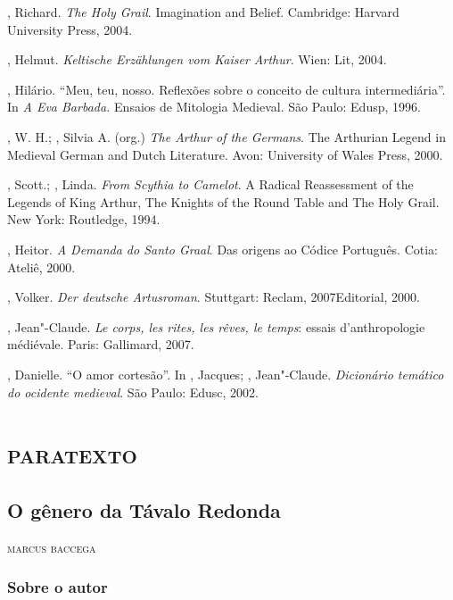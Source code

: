 \begin{bibliohedra}

, Richard. \textit{ The Holy Grail}. Imagination and Belief. Cambridge:
Harvard University Press, 2004.

, Helmut. \textit{Keltische Erzählungen vom Kaiser Arthur}. Wien: Lit,
2004.

, Hilário. “Meu, teu, nosso. Reflexões sobre o conceito de cultura
intermediária”. In \textit{A Eva Barbada. }Ensaios de Mitologia Medieval. São
Paulo: Edusp, 1996.

, W. H.; , Silvia A. (org.) \textit{The Arthur of the Germans}. The
Arthurian Legend in Medieval German and Dutch Literature. Avon: University of
Wales Press, 2000. 

, Scott.; , Linda. \textit{From Scythia to Camelot}. A Radical
Reassessment of the Legends of King Arthur, The Knights of the Round Table and
The Holy Grail. New York: Routledge, 1994.

, Heitor. \textit{A Demanda do Santo Graal}. Das origens ao Códice
Português. Cotia: Ateliê, 2000.

, Volker. \textit{Der deutsche Artusroman}. Stuttgart: Reclam,
2007Editorial, 2000.

, Jean"-Claude. \textit{Le corps, les rites, les rêves, le temps}: essais
d’anthropologie médiévale. Paris: Gallimard, 2007.

, Danielle. “O amor cortesão”. In , Jacques; ,
Jean"-Claude. \textit{Dicionário temático do ocidente medieval}. São Paulo:
Edusc, 2002.
\end{bibliohedra}



\part{\textsc{paratexto}}


\chapter{O gênero da Távalo Redonda}

\begin{flushright}
\textsc{marcus baccega}
\end{flushright}

\section{Sobre o autor}

